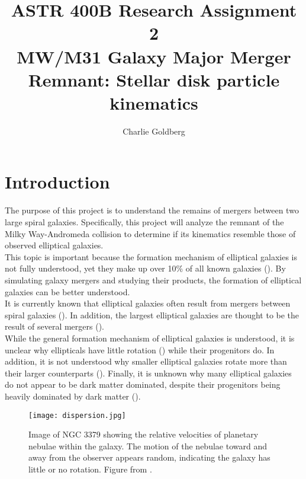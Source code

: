 \documentclass[linenumbers]{aastex63}
\begin{document}
\title{ASTR 400B Research Assignment 2 \\
MW/M31 Galaxy Major Merger Remnant: Stellar disk particle kinematics}

\author[0000-0002-4901-7693]{Charlie Goldberg}


\section{Introduction}

The purpose of this project is to understand the remains of mergers between two large spiral galaxies. Specifically, this project will analyze the remnant of the Milky Way-Andromeda collision to determine if its kinematics resemble those of observed elliptical galaxies.\\

This topic is important because the formation mechanism of elliptical galaxies is not fully understood, yet they make up over 10\% of all known galaxies (\cite{1996MNRAS.278.1025L}). By simulating galaxy mergers and studying their products, the formation of elliptical galaxies can be better understood.\\

It is currently known that elliptical galaxies often result from mergers between spiral galaxies (\cite{2006ApJ...650..791C}). In addition, the largest elliptical galaxies are thought to be the result of several mergers (\cite{2006ApJ...650..791C}).\\

While the general formation mechanism of elliptical galaxies is understood, it is unclear why ellipticals have little rotation (\cite{1998A&AS..133..325G}) while their progenitors do. In addition, it is not understood why smaller elliptical galaxies rotate more than their larger counterparts (\cite{2011MNRAS.414..888E}). Finally, it is unknown why many elliptical galaxies do not appear to be dark matter dominated, despite their progenitors being heavily dominated by dark matter (\cite{2003Sci...301.1696R}).

\begin{figure}
    \centering
    \texttt{[image: dispersion.jpg]}
    \caption{Image of NGC 3379 showing the relative velocities of planetary nebulae within the galaxy. The motion of the nebulae toward and away from the observer appears random, indicating the galaxy has little or no rotation. Figure from \cite{2003Sci...301.1696R}.}
    \label{dispersion}
\end{figure}
\end{document}
